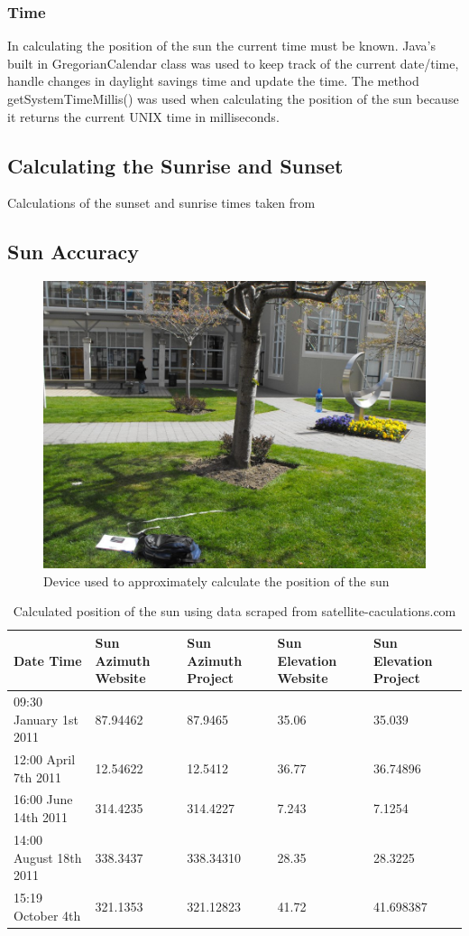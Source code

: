 \documentclass[12pt]{report}
\begin{document}
\subsubsection{Time}
In calculating the position of the sun the current time must be known. Java's built in GregorianCalendar class was used to keep track of the current date/time, handle changes in daylight savings time and update the time. The method getSystemTimeMillis() was used when calculating the position of the sun because it returns the current UNIX time in milliseconds.

\subsection{Calculating the Sunrise and Sunset}
Calculations of the sunset and sunrise times taken from \cite{sunrise} 
\subsection{Sun Accuracy}
\begin{figure}
\includegraphics[scale=0.4]{contraption.jpg}
\caption{Device used to approximately calculate the position of the sun}
\label{sun-contraption}
\end{figure}

\begin{table}
\begin{tabular}{ | l | l | l | l  | l |}
\hline
Date Time & Sun Azimuth Website & Sun Azimuth Project & Sun Elevation Website & Sun Elevation Project\\ \hline
09:30 January 1st 2011 & 87.94462 & 87.9465 & 35.06 & 35.039\\ \hline
12:00 April 7th 2011 & 12.54622 & 12.5412 & 36.77 & 36.74896\\ \hline
16:00 June 14th 2011 & 314.4235 & 314.4227 & 7.243 & 7.1254\\ \hline
14:00 August 18th 2011 & 338.3437 & 338.34310 & 28.35 & 28.3225\\ \hline
15:19 October 4th & 321.1353 & 321.12823 & 41.72 & 41.698387\\ \hline
\end{tabular}
\caption{Calculated position of the sun using data scraped from satellite-caculations.com\cite{solarpos}}
\label{websun}
\end{table}
\end{document}
